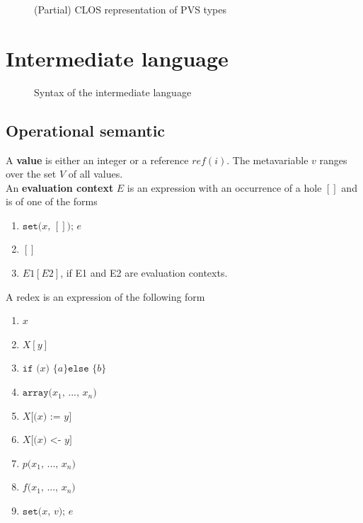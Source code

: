 \documentclass[12pt,a4paper,titlepage]{article}
\newcommand{\cl}[1]{\texttt{#1}}
\begin{document}
\begin{figure}[!ht]

\caption{(Partial) CLOS representation of PVS types}
\label{fig:PVS-CLOS-types}
\end{figure}


\newpage
\section{Intermediate language}


\begin{figure}[!ht]

\caption{Syntax of the intermediate language}
\label{fig:aux-syntax}
\end{figure}

\subsection{Operational semantic}

A \textbf{value} is either an integer or a reference $ref(i)$. The metavariable $v$ ranges over the set $V$ of all values.\\

An \textbf{evaluation context} $E$ is an expression with an occurrence of a hole $[]$ and is of one of the forms
\begin{enumerate}
\item $\cl{set(} x \cl{, } [] \cl{); } e $
\item $[]$
\item $E1[E2]$, if E1 and E2 are evaluation contexts.
\end{enumerate}

A redex is an expression of the following form
\begin{enumerate}
\item $x$
\item $X[y]$
\item $\cl{if (} x \cl{) \{} a \cl{\} else \{} b \cl{\}}$
\item $\cl{array(} x_1 \cl{, } ... \cl{, } x_n \cl{)}$
\item $X\cl{[(} x \cl{) := } y \cl{]}$
\item $X\cl{[(} x \cl{) <- } y \cl{]}$
\item $p\cl{(} x_1 \cl{, } ... \cl{, } x_n \cl{)}$
\item $f\cl{(} x_1 \cl{, } ... \cl{, } x_n \cl{)}$
\item $\cl{set(} x \cl{, } v \cl{); } e$
\end{enumerate}
\end{document}
